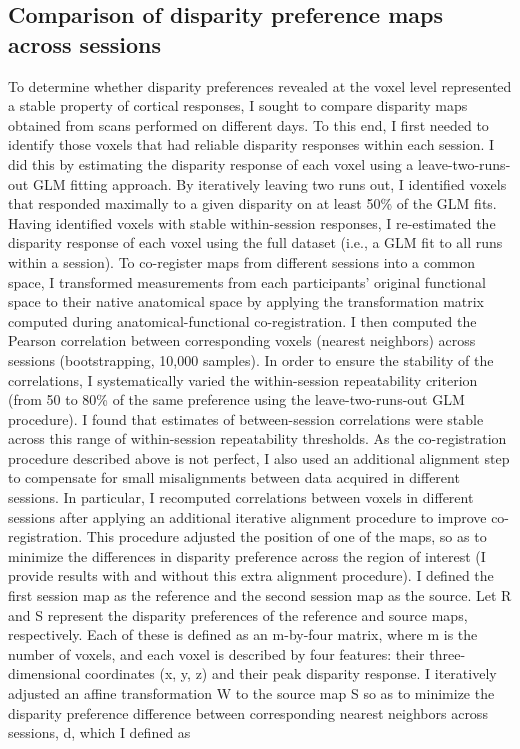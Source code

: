 \subsection{Comparison of disparity preference maps across sessions}
To determine whether disparity preferences revealed at the voxel level represented a stable property of cortical responses, I sought to compare disparity maps obtained from scans performed on different days. To this end, I first needed to identify those voxels that had reliable disparity responses within each session. I did this by estimating the disparity response of each voxel using a leave-two-runs-out GLM fitting approach. By iteratively leaving two runs out, I identified voxels that responded maximally to a given disparity on at least 50\% of the GLM fits. Having identified voxels with stable within-session responses, I re-estimated the disparity response of each voxel using the full dataset (i.e., a GLM fit to all runs within a session). To co-register maps from different sessions into a common space, I transformed measurements from each participants' original functional space to their native anatomical space by applying the transformation matrix computed during anatomical-functional co-registration. I then computed the Pearson correlation between corresponding voxels (nearest neighbors) across sessions (bootstrapping, 10,000 samples). In order to ensure the stability of the correlations, I systematically varied the within-session repeatability criterion (from 50 to 80\% of the same preference using the leave-two-runs-out GLM procedure). I found that estimates of between-session correlations were stable across this range of within-session repeatability thresholds.
As the co-registration procedure described above is not perfect, I also used an additional alignment step to compensate for small misalignments between data acquired in different sessions. In particular, I recomputed correlations between voxels in different sessions after applying an additional iterative alignment procedure to improve co-registration. This procedure adjusted the position of one of the maps, so as to minimize the differences in disparity preference across the region of interest (I provide results with and without this extra alignment procedure). I defined the first session map as the reference and the second session map as the source. Let R and S represent the disparity preferences of the reference and source maps, respectively. Each of these is defined as an m-by-four matrix, where m is the number of voxels, and each voxel is described by four features: their three-dimensional coordinates (x, y, z) and their peak disparity response. I iteratively adjusted an affine transformation W to the source map S so as to minimize the disparity preference difference between corresponding nearest neighbors across sessions, d, which I defined as

